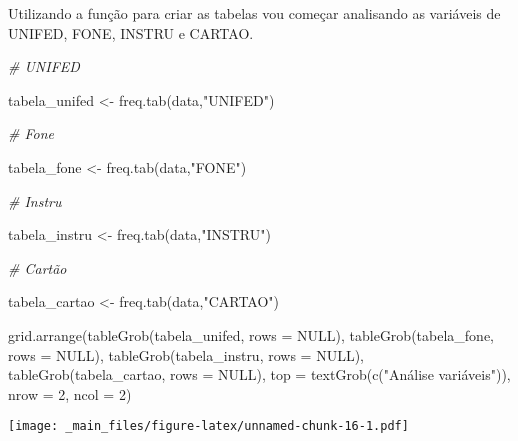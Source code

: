 \documentclass[
]{book}
\newenvironment{Shaded}{\begin{snugshade}}{\end{snugshade}}
\newcommand{\AttributeTok}[1]{\textcolor[rgb]{0.77,0.63,0.00}{#1}}
\newcommand{\CommentTok}[1]{\textcolor[rgb]{0.56,0.35,0.01}{\textit{#1}}}
\newcommand{\ConstantTok}[1]{\textcolor[rgb]{0.00,0.00,0.00}{#1}}
\newcommand{\DecValTok}[1]{\textcolor[rgb]{0.00,0.00,0.81}{#1}}
\newcommand{\FunctionTok}[1]{\textcolor[rgb]{0.00,0.00,0.00}{#1}}
\newcommand{\NormalTok}[1]{#1}
\newcommand{\OtherTok}[1]{\textcolor[rgb]{0.56,0.35,0.01}{#1}}
\newcommand{\StringTok}[1]{\textcolor[rgb]{0.31,0.60,0.02}{#1}}
\begin{document}
Utilizando a função para criar as tabelas vou começar analisando as variáveis de UNIFED, FONE, INSTRU e CARTAO.

\begin{Shaded}
\begin{Highlighting}[]
\CommentTok{\# UNIFED}

\NormalTok{tabela\_unifed }\OtherTok{\textless{}{-}} \FunctionTok{freq.tab}\NormalTok{(data,}\StringTok{"UNIFED"}\NormalTok{)}

\CommentTok{\# Fone}

\NormalTok{tabela\_fone }\OtherTok{\textless{}{-}} \FunctionTok{freq.tab}\NormalTok{(data,}\StringTok{"FONE"}\NormalTok{)}

\CommentTok{\# Instru}

\NormalTok{tabela\_instru }\OtherTok{\textless{}{-}} \FunctionTok{freq.tab}\NormalTok{(data,}\StringTok{"INSTRU"}\NormalTok{)}

\CommentTok{\# Cartão}

\NormalTok{tabela\_cartao }\OtherTok{\textless{}{-}} \FunctionTok{freq.tab}\NormalTok{(data,}\StringTok{"CARTAO"}\NormalTok{)}

\FunctionTok{grid.arrange}\NormalTok{(}\FunctionTok{tableGrob}\NormalTok{(tabela\_unifed, }\AttributeTok{rows =} \ConstantTok{NULL}\NormalTok{),}
             \FunctionTok{tableGrob}\NormalTok{(tabela\_fone, }\AttributeTok{rows =} \ConstantTok{NULL}\NormalTok{),}
             \FunctionTok{tableGrob}\NormalTok{(tabela\_instru, }\AttributeTok{rows =} \ConstantTok{NULL}\NormalTok{),}
             \FunctionTok{tableGrob}\NormalTok{(tabela\_cartao, }\AttributeTok{rows =} \ConstantTok{NULL}\NormalTok{),}
             \AttributeTok{top =} \FunctionTok{textGrob}\NormalTok{(}\FunctionTok{c}\NormalTok{(}\StringTok{"Análise variáveis"}\NormalTok{)),}
             \AttributeTok{nrow =} \DecValTok{2}\NormalTok{, }\AttributeTok{ncol =} \DecValTok{2}\NormalTok{)}
\end{Highlighting}
\end{Shaded}

\texttt{[image: \_main\_files/figure-latex/unnamed-chunk-16-1.pdf]}

  
\end{document}
